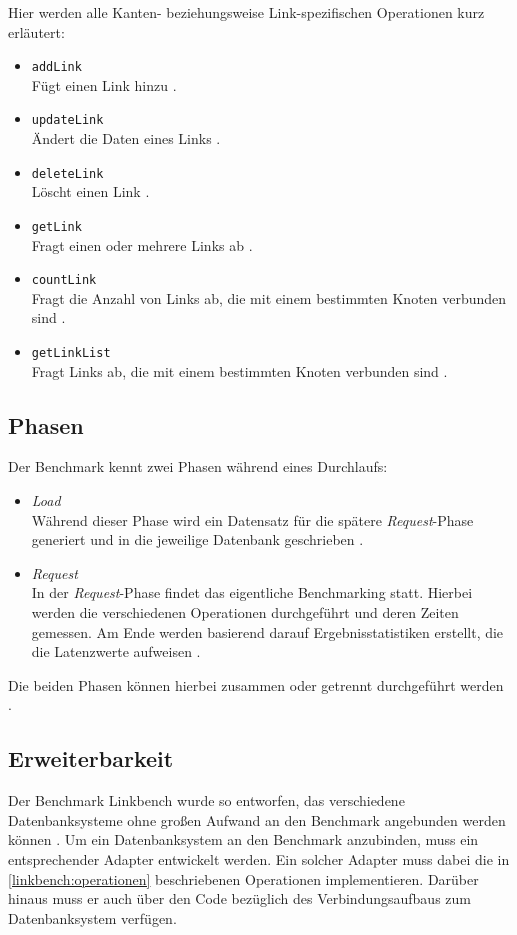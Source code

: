 Hier werden alle Kanten- beziehungsweise Link-spezifischen Operationen kurz erläutert:
\begin{itemize}
    \item \texttt{addLink}\\
    Fügt einen Link hinzu \cite{fb_linkbench_github}.
    \item \texttt{updateLink}\\
    Ändert die Daten eines Links  \cite{fb_linkbench_github}.
    \item \texttt{deleteLink}\\
    Löscht einen Link \cite{fb_linkbench_github}.
    \item \texttt{getLink}\\
    Fragt einen oder mehrere Links ab \cite{fb_linkbench_github}.
    \item \texttt{countLink}\\
    Fragt die Anzahl von Links ab, die mit einem bestimmten Knoten verbunden sind \cite{fb_linkbench_github}.
    \item \texttt{getLinkList}\\
    Fragt Links ab, die mit einem bestimmten Knoten verbunden sind \cite{fb_linkbench_github}.
\end{itemize}

\subsection{Phasen}
Der Benchmark kennt zwei Phasen während eines Durchlaufs: 
\begin{itemize}
    \item \textit{Load}\\
    Während dieser Phase wird ein Datensatz für die spätere \textit{Request}-Phase generiert und in die jeweilige Datenbank geschrieben \cite{fb_linkbench_github}.
    \item \textit{Request}\\
    In der \textit{Request}-Phase findet das eigentliche Benchmarking statt. Hierbei werden die verschiedenen Operationen durchgeführt und deren Zeiten gemessen. Am Ende werden basierend darauf Ergebnisstatistiken erstellt, die die Latenzwerte aufweisen \cite{fb_linkbench_github}. 
\end{itemize}
Die beiden Phasen können hierbei zusammen oder getrennt durchgeführt werden \cite{fb_linkbench_github}.

\subsection{Erweiterbarkeit}
Der Benchmark Linkbench wurde so entworfen, das verschiedene Datenbanksysteme ohne großen Aufwand an den Benchmark angebunden werden können \cite{linkbench_paper}. Um ein Datenbanksystem an den Benchmark anzubinden, muss ein entsprechender Adapter entwickelt werden. Ein solcher Adapter muss dabei die in \autoref{linkbench:operationen} beschriebenen Operationen implementieren. Darüber hinaus muss er auch über den Code bezüglich des Verbindungsaufbaus zum Datenbanksystem verfügen. 

